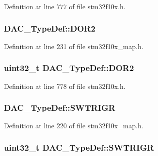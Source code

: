 Definition at line 777 of file stm32f10x.\+h.

\subsubsection[{\texorpdfstring{D\+O\+R2}{DOR2}}]{ D\+A\+C\+\_\+\+Type\+Def\+::\+D\+O\+R2}\hypertarget{struct_d_a_c___type_def_a8f474c29e33cdbddb202a0e6482eea6d}{}\label{struct_d_a_c___type_def_a8f474c29e33cdbddb202a0e6482eea6d}


Definition at line 231 of file stm32f10x\+\_\+map.\+h.

\subsubsection[{\texorpdfstring{D\+O\+R2}{DOR2}}]{ {\bf uint32\+\_\+t} D\+A\+C\+\_\+\+Type\+Def\+::\+D\+O\+R2}\hypertarget{struct_d_a_c___type_def_a1bde8391647d6422b39ab5ba4f13848b}{}\label{struct_d_a_c___type_def_a1bde8391647d6422b39ab5ba4f13848b}


Definition at line 778 of file stm32f10x.\+h.

\subsubsection[{\texorpdfstring{S\+W\+T\+R\+I\+GR}{SWTRIGR}}]{ D\+A\+C\+\_\+\+Type\+Def\+::\+S\+W\+T\+R\+I\+GR}\hypertarget{struct_d_a_c___type_def_af0ca3bc9469062c7c7505327e887fc53}{}\label{struct_d_a_c___type_def_af0ca3bc9469062c7c7505327e887fc53}


Definition at line 220 of file stm32f10x\+\_\+map.\+h.

\subsubsection[{\texorpdfstring{S\+W\+T\+R\+I\+GR}{SWTRIGR}}]{ {\bf uint32\+\_\+t} D\+A\+C\+\_\+\+Type\+Def\+::\+S\+W\+T\+R\+I\+GR}\hypertarget{struct_d_a_c___type_def_a4ccb66068a1ebee1179574dda20206b6}{}\label{struct_d_a_c___type_def_a4ccb66068a1ebee1179574dda20206b6}


